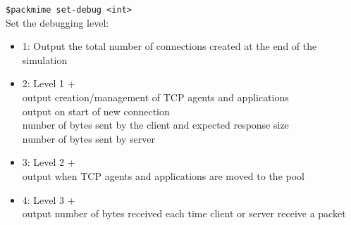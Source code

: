 {\tt \$packmime set-debug <int>}\\
Set the debugging level:
\begin{itemize}
\item{1: Output the total number of connections created at the end of
the simulation}
\item{2: Level 1 + \\
output creation/management of TCP agents and applications\\
output on start of new connection\\
number of bytes sent by the client and expected response size\\
number of bytes sent by server}
\item{3: Level 2 + \\
output when TCP agents and applications are moved to the pool}
\item{4: Level 3 + \\
output number of bytes received each time client or server receive a packet}
\end{itemize}



